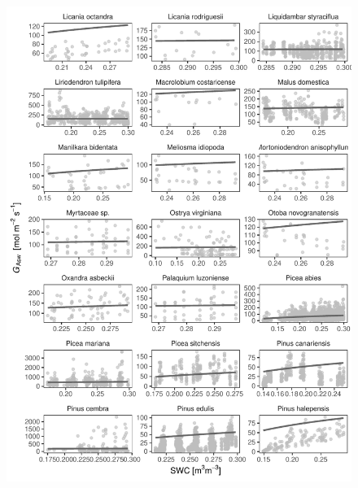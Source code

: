 \documentclass[11pt,twoside]{reedthesis}
\begin{document}
\begin{figure}[H]

{\centering \includegraphics[width=1\linewidth]{figure/appendixD/ggg12} 

}

\end{figure}
\end{document}
